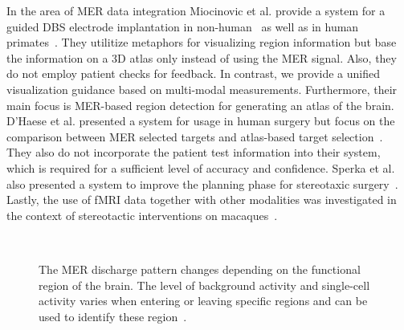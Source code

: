 \documentclass[review]{vgtc}                 %
\begin{document}
In the area of MER data integration Miocinovic et al. provide a system for a guided DBS electrode implantation in non-human~\cite{Miocinovic2007} as well as in human primates~\cite{Cicerone2}. They utilitize metaphors for visualizing region information but base the information on a 3D atlas only instead of using the MER signal. Also, they do not employ patient checks for feedback. In contrast, we provide a unified visualization guidance based on multi-modal measurements. Furthermore, their main focus is MER-based region detection for generating an atlas of the brain. D'Haese et al. presented a system for usage in human surgery but focus on the comparison between MER selected targets and atlas-based target selection~\cite{Haese2005}. They also do not incorporate the patient test information into their system, which is required for a sufficient level of accuracy and confidence. Sperka et al. also presented a system to improve the planning phase for stereotaxic surgery~\cite{Sperka2011}. Lastly, the use of fMRI data together with other modalities was investigated in the context of stereotactic interventions on macaques~\cite{Ohayon2012}.
%
%
%

\begin{figure}
    \centering
    \\
    \caption{The MER discharge pattern changes depending on the functional region of the brain. The level of background activity and single-cell activity varies when entering or leaving specific regions and can be used to identify these region~\cite{Benazzouz2002,Hutchison1998}.}
    \label{fig:dischargepatterns}
\end{figure}
\end{document}
